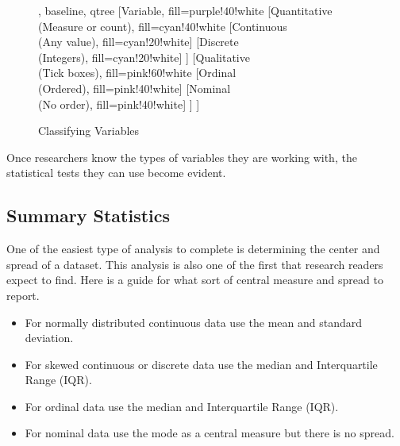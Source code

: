 \begin{figure}[H]
	\centering

		
	\begin{forest}, baseline, qtree
		[Variable, fill=purple!40!white
			[{Quantitative\\(Measure or count)}, fill=cyan!40!white
				[{Continuous\\(Any value)}, fill=cyan!20!white]
				[{Discrete\\(Integers)}, fill=cyan!20!white]
			]
			[{Qualitative\\(Tick boxes)}, fill=pink!60!white
				[{Ordinal\\(Ordered)}, fill=pink!40!white]
				[{Nominal\\(No order)}, fill=pink!40!white]
			]
		]
	\end{forest}

	\caption{Classifying Variables}
	\label{fig06.08}
\end{figure}

Once researchers know the types of variables they are working with, the statistical tests they can use become evident.

\subsection{Summary Statistics}

One of the easiest type of analysis to complete is determining the center and spread of a dataset. This analysis is also one of the first that research readers expect to find. Here is a guide for what sort of central measure and spread to report.

\begin{itemize}
	\item For normally distributed continuous data use the mean and standard deviation.
	\item For skewed continuous or discrete data use the median and Interquartile Range (IQR).
	\item For ordinal data use the median and Interquartile Range (IQR).
	\item For nominal data use the mode as a central measure but there is no spread.
\end{itemize}

